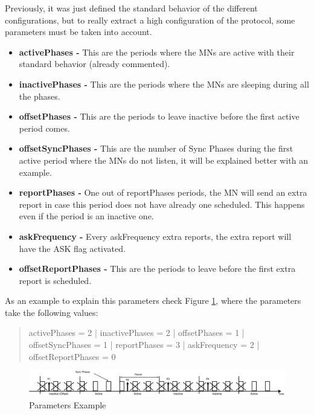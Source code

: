Previously, it was just defined the standard behavior of the different configurations, but to really extract a high configuration of the protocol, some 
parameters must be taken into account.

\begin{itemize}
 \item \textbf{activePhases -} This are the periods where the \acp{MN} are active with their standard behavior (already commented).
 \item \textbf{inactivePhases -} This are the periods where the \acp{MN} are sleeping during all the phases.
 \item \textbf{offsetPhases -} This are the periods to leave inactive before the first active period comes.
 \item \textbf{offsetSyncPhases -} This are the number of Sync Phases during the first active period where the \acp{MN} do not listen, it will be explained 
better with an example.
 \item \textbf{reportPhases -} One out of reportPhases periods, the \ac{MN} will send an extra report in case this period does not have already one
scheduled. This happens even if the period is an inactive one.
 \item \textbf{askFrequency -} Every askFrequency extra reports, the extra report will have the ASK flag activated.
 \item \textbf{offsetReportPhases -} This are the periods to leave before the first extra report is scheduled.
\end{itemize}
 
As an example to explain this parameters check Figure \ref{fig:parametersphases}, where the parameters take the following values: 

\begin{quote}
 activePhases = 2 | inactivePhases = 2 | offsetPhases = 1 | offsetSyncPhases = 1 | reportPhases = 3 | askFrequency = 2 | offsetReportPhases = 0
\end{quote}

\begin{figure}[ht]
 \begin{center}
  \includegraphics[width=1\textwidth]{parametersphases.eps}
 \end{center}
 \caption{Parameters Example}
 \label{fig:parametersphases}
\end{figure}

